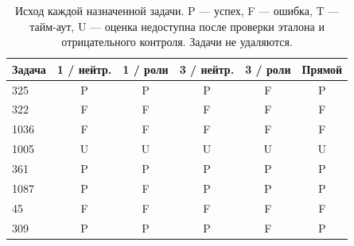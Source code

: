 \begin{table}[htbp]
\centering\small
\caption{Исход каждой назначенной задачи. P --- успех, F --- ошибка, T --- тайм-аут, U --- оценка недоступна после проверки эталона и отрицательного контроля. Задачи не удаляются.}
\label{tab:codextasks}
\begin{tabular}{lccccc}
\toprule
Задача & 1 / нейтр. & 1 / роли & 3 / нейтр. & 3 / роли & Прямой \\
\midrule
325 & P & P & P & F & P \\
322 & F & F & F & F & F \\
1036 & F & F & F & F & F \\
1005 & U & U & U & U & U \\
361 & P & P & P & P & P \\
1087 & P & F & P & P & P \\
45 & F & F & F & F & F \\
309 & P & P & P & F & P \\
\bottomrule
\end{tabular}
\end{table}
